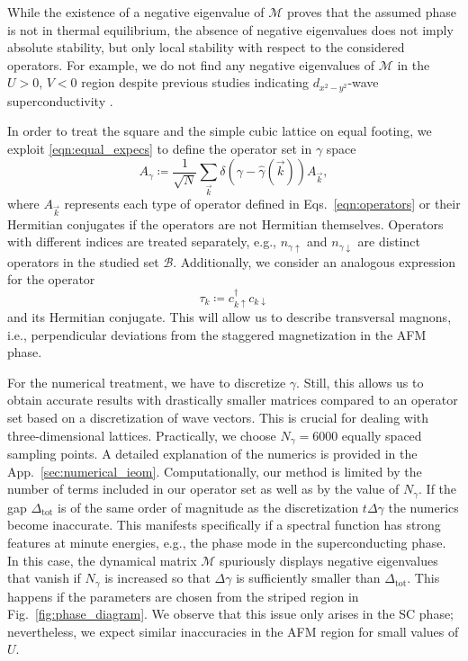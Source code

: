 \documentclass[
    reprint, 
    aps,
    preprintnumbers,
    twocolumn,
    prb,
    superscriptaddress
]{revtex4-2}
\newcommand{\vk}{\vec{k}}
\newcommand{\up}{\uparrow}
\newcommand{\down}{\downarrow}
\newcommand{\mM}{\mathcal{M}}
\begin{document}
While the existence of a negative eigenvalue of $\mM$ proves that the assumed phase is
not in thermal equilibrium, the absence of negative eigenvalues does not imply absolute stability,
but only local stability with respect to the considered operators.
For example, we do not find any negative eigenvalues of $\mM$ in the $U>0$, $V<0$ region despite previous studies indicating $d_{x^2 - y^2}$-wave superconductivity \cite{Micnas88b,Huang13}.

In order to treat the square and the simple cubic lattice on equal footing, we exploit 
\eqref{eqn:equal_expecs} to define the operator set in $\gamma$ space
\begin{equation}
    \label{eqn:ieom_basis_operator}
    A_\gamma \coloneqq \frac{1}{\sqrt{N}} \sum_{\vk} \delta (\gamma - \widehat{\gamma}( \vk )) A_{\vk},
\end{equation}
where $A_{\vk}$ represents each type of operator defined in Eqs.~\eqref{eqn:operators} or
their Hermitian conjugates if the operators are not Hermitian themselves.
Operators with different indices are treated separately, e.g., $n_{\gamma \up}$ and $n_{\gamma \down}$ 
are distinct operators in the studied set $\mathcal{B}$.
Additionally, we consider an analogous expression for the operator
\begin{equation}
    \tau_{k} \coloneqq c_{k \uparrow}^\dagger c_{k \downarrow}
\end{equation}
and its Hermitian conjugate.
This will allow us to describe transversal magnons, i.e., perpendicular 
deviations from the staggered magnetization in the AFM phase.


For the numerical treatment, we have to discretize $\gamma$.
Still, this allows us to obtain accurate results with drastically smaller matrices 
compared to an operator set based on a discretization of wave vectors.
This is crucial for dealing with three-dimensional lattices.
Practically, we choose $N_\gamma = 6000$ equally spaced sampling points.
A detailed explanation of the numerics is provided in the App.\ \ref{sec:numerical_ieom}.
Computationally, our method is limited by the number of terms included in our operator set 
as well as by the value of $N_\gamma$.
If the gap $\Delta_\text{tot}$ is of the same order of magnitude as the discretization $t \Delta \gamma$ the numerics become inaccurate.
This manifests specifically if a spectral function has strong features at minute energies, e.g., 
the phase mode in the superconducting phase.
In this case, the dynamical matrix $\mM$ spuriously displays negative eigenvalues that vanish if 
$N_\gamma$ is increased so that $\Delta \gamma$ is sufficiently smaller than $\Delta_\text{tot}$.
This happens if the parameters are chosen from the striped region in Fig.\ \ref{fig:phase_diagram}.
We observe that this issue only arises in the SC phase;
nevertheless, we expect similar inaccuracies in the AFM region for small values of $U$.
\end{document}
